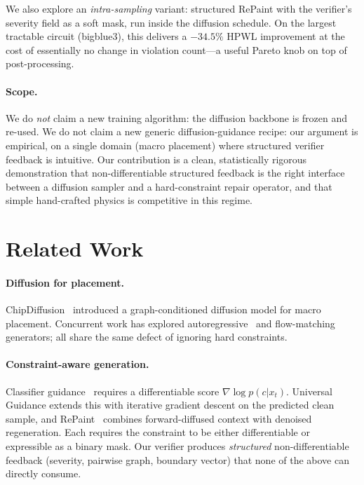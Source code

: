 \documentclass{article}
\begin{document}
We also explore an \emph{intra-sampling} variant: structured RePaint with
the verifier's severity field as a soft mask, run inside the diffusion
schedule.  On the largest tractable circuit (bigblue3), this delivers a
$-34.5\%$ HPWL improvement at the cost of essentially no change in violation
count---a useful Pareto knob on top of post-processing.

\paragraph{Scope.}  We do \emph{not} claim a new training algorithm: the
diffusion backbone is frozen and re-used.  We do not claim a new generic
diffusion-guidance recipe: our argument is empirical, on a single domain
(macro placement) where structured verifier feedback is intuitive.  Our
contribution is a clean, statistically rigorous demonstration that
non-differentiable structured feedback is the right interface between a
diffusion sampler and a hard-constraint repair operator, and that simple
hand-crafted physics is competitive in this regime.

\section{Related Work}

\paragraph{Diffusion for placement.}  ChipDiffusion~\cite{chipdiffusion}
introduced a graph-conditioned diffusion model for macro placement.  Concurrent
work has explored autoregressive~\cite{miraichip} and flow-matching
\cite{chipflow} generators; all share the same defect of ignoring hard
constraints.

\paragraph{Constraint-aware generation.}  Classifier
guidance~\cite{classifier-guidance} requires a differentiable score
$\nabla \log p(c|x_t)$.  Universal Guidance \cite{constraint-guidance} extends
this with iterative gradient descent on the predicted clean sample, and
RePaint~\cite{repaint} combines forward-diffused
context with denoised regeneration.  Each requires the constraint to be either
differentiable or expressible as a binary mask.  Our verifier produces
\emph{structured} non-differentiable feedback (severity, pairwise graph,
boundary vector) that none of the above can directly consume.
\end{document}
